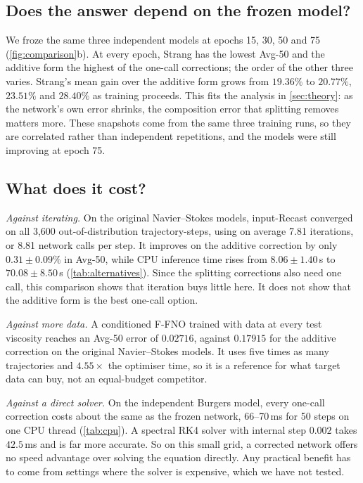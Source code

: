 \documentclass{article}
\theoremstyle{plain}
\newcommand{\add}{additive correction\xspace}
\begin{document}
\subsection{Does the answer depend on the frozen model?}
\label{sec:quality}

We froze the same three independent models at epochs 15, 30, 50 and 75 (\cref{fig:comparison}b).
At every epoch, Strang has the lowest Avg-50 and the additive form the highest of the one-call corrections; the order of the other three varies. Strang's mean gain over the additive form grows from $19.36\%$ to $20.77\%$, $23.51\%$ and $28.40\%$ as training proceeds.
This fits the analysis in \cref{sec:theory}: as the network's own error shrinks, the composition error that splitting removes matters more.
These snapshots come from the same three training runs, so they are correlated rather than independent repetitions, and the models were still improving at epoch 75.

\subsection{What does it cost?}
\label{sec:cost}



\emph{Against iterating.}
On the original Navier--Stokes models, input-Recast converged on all 3,600 out-of-distribution trajectory-steps, using on average 7.81 iterations, or 8.81 network calls per step.
It improves on the \add by only $0.31\pm0.09\%$ in Avg-50, while CPU inference time rises from $8.06\pm1.40$\,s to $70.08\pm8.50$\,s (\cref{tab:alternatives}).
Since the splitting corrections also need one call, this comparison shows that iteration buys little here. It does not show that the additive form is the best one-call option.

\emph{Against more data.}
A conditioned F-FNO trained with data at every test viscosity reaches an Avg-50 error of $0.02716$, against $0.17915$ for the \add on the original Navier--Stokes models.
It uses five times as many trajectories and $4.55\times$ the optimiser time, so it is a reference for what target data can buy, not an equal-budget competitor.

\emph{Against a direct solver.}
On the independent Burgers model, every one-call correction costs about the same as the frozen network, 66--70\,ms for 50 steps on one CPU thread (\cref{tab:cpu}).
A spectral RK4 solver with internal step $0.002$ takes $42.5$\,ms and is far more accurate.
So on this small grid, a corrected network offers no speed advantage over solving the equation directly.
Any practical benefit has to come from settings where the solver is expensive, which we have not tested.
\end{document}
